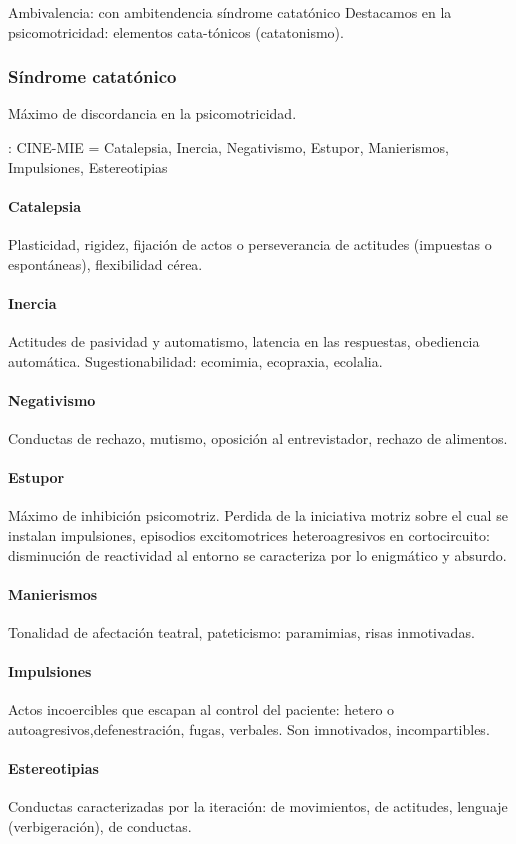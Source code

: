 Ambivalencia: con ambitendencia síndrome catatónico Destacamos en la psicomotricidad: elementos cata-tónicos (catatonismo).
\subsubsection*{Síndrome catatónico}
Máximo de discordancia en la psicomotricidad.

\faLightbulb: CINE-MIE = Catalepsia, Inercia, Negativismo, Estupor, Manierismos, Impulsiones, Estereotipias

\paragraph*{Catalepsia}
Plasticidad, rigidez, fijación de actos o perseverancia de actitudes (impuestas o espontáneas), flexibilidad cérea.
\paragraph*{Inercia}
Actitudes de pasividad y automatismo, latencia en las respuestas, obediencia automática. Sugestionabilidad: ecomimia, ecopraxia, ecolalia.
\paragraph*{Negativismo}
Conductas de rechazo, mutismo, oposición al entrevistador, rechazo de alimentos.
\paragraph*{Estupor}
Máximo de inhibición psicomotriz. Perdida de la iniciativa motriz sobre el cual se instalan impulsiones, episodios excitomotrices heteroagresivos en cortocircuito: disminución de reactividad al entorno se caracteriza por lo enigmático y absurdo.
\paragraph*{Manierismos}
Tonalidad de afectación teatral, pateticismo: paramimias, risas inmotivadas.
\paragraph*{Impulsiones}
Actos incoercibles que escapan al control del paciente: hetero o autoagresivos,defenestración, fugas, verbales. Son imnotivados, incompartibles.
\paragraph*{Estereotipias}
Conductas caracterizadas por la iteración: de movimientos, de actitudes, lenguaje (verbigeración), de conductas.
